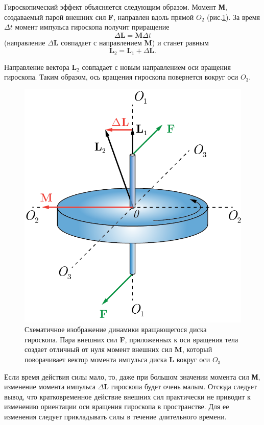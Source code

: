 \documentclass[14pt,a4paper,oneside]{extarticle}	%
\begin{document}
	Гироскопический эффект объясняется следующим образом.
	Момент  \textbf{М}, создаваемый парой внешних сил \textbf{F}, направлен вдоль прямой $ O_2 $ (рис.\ref{gyro-3}). 
	За время $ \Delta t $ момент импульса гироскопа получит приращение $$ \Delta \textbf{L} = \textbf{M} \Delta t $$ (направление $ \Delta \textbf{L} $ совпадает с направлением \textbf{M}) и станет равным $$ \textbf{L}_2=\textbf{L}_1+\Delta \textbf{L}. $$
	
	Направление вектора $ \textbf{L}_2 $ совпадает с новым направлением оси вращения гироскопа.
	Таким образом, ось вращения гироскопа повернется вокруг оси $ O_3 $.
	
			\begin{figure}[H]
	\centering 	
	\includegraphics[width=0.6\linewidth]{gyro-3.png}
	\caption{Схематичное изображение динамики вращающегося диска гироскопа. Пара внешних сил \textbf{F}, приложенных к оси вращения тела создает отличный от нуля момент внешних сил \textbf{M}, который поворачивает вектор момента импульса диска $ \textbf{L} $ вокруг оси $ O_3 $}
	\label{gyro-3}
\end{figure}
	
	Если время действия силы мало, то, даже при большом значении момента сил \textbf{М}, изменение момента импульса $ \Delta\textbf{L} $ гироскопа будет очень малым.
	Отсюда следует вывод, что кратковременное действие внешних сил практически не приводит к изменению ориентации оси вращения гироскопа в пространстве.
	Для ее изменения следует прикладывать силы в течение длительного времени.
	
\end{document}
